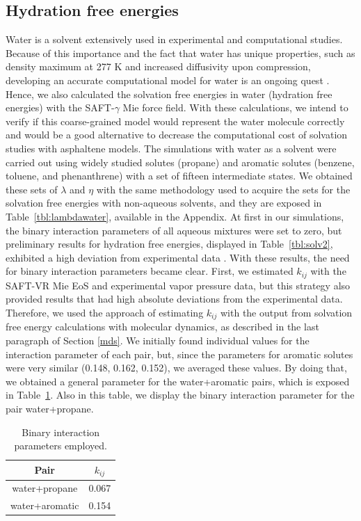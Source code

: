 \documentclass[final,12p,times,twocolumn]{elsarticle}
\begin{document}
	\subsection{Hydration free energies}
	
	Water is a solvent extensively used in experimental and computational studies. Because of this importance and the fact that water has unique properties, such as density maximum at 277 K and increased diffusivity upon compression, developing an accurate computational model for water is an ongoing quest \cite{hadley2012}. Hence, we also calculated the solvation free energies in water (hydration free energies) with the SAFT-$\gamma$ Mie force field. With these calculations, we intend to verify if this coarse-grained model would represent the water molecule correctly and would be a good alternative to decrease the computational cost of solvation studies with asphaltene models. The simulations with water as a solvent were carried out using widely studied solutes (propane) and aromatic solutes (benzene, toluene, and phenanthrene) with a set of fifteen intermediate states.  We obtained these sets of $\lambda$ and $\eta$ with the same methodology used to acquire the sets for the solvation free energies with non-aqueous solvents, and they are exposed in Table~\ref{tbl:lambdawater}, available in the Appendix. At first in our simulations, the binary interaction parameters of all aqueous mixtures were set to zero, but preliminary results for hydration free energies, displayed in Table~\ref{tbl:solv2},  exhibited a high deviation from experimental data \cite{P29900000291, doi:10.1021/ct050097l}. With these results, the need for binary interaction parameters became clear. First, we estimated $k_{ij}$ with the SAFT-VR Mie EoS and experimental vapor pressure data, but this strategy also provided results that had high absolute deviations from the experimental data. Therefore, we used the approach of estimating $k_{ij}$ with the output from solvation free energy calculations with molecular dynamics, as described in the last paragraph of Section \ref{mds}.  We initially found individual values for the interaction parameter of each pair, but, since the parameters for aromatic solutes were very similar (0.148, 0.162, 0.152), we averaged these values. By doing that,  we obtained a general parameter for the water+aromatic pairs, which is exposed in Table~\ref{tbl:kij}. Also in this table, we display the binary interaction parameter for the pair water+propane. 
	
	\begin{table}
		\centering
		\caption{Binary interaction parameters employed.}
		\label{tbl:kij}
		\begin{tabular}{cc}
			\hline\hline
			Pair              & $k_{ij}$ \\ \hline
			water+propane  & 0.067    \\
			water+aromatic & 0.154    \\ \hline\hline
		\end{tabular}
	\end{table}
	
\end{document}
